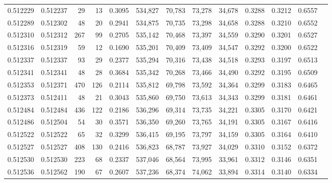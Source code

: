 \begin{tabular}{rrrrrrrrrrrrr}
0.512229 & 0.512237 &    29 &    13 &                                     0.3095 & 534,827 &  70,783 &  73,278 &  34,678 & 0.3288 & 0.3212 & 0.6557 \\
0.512289 & 0.512302 &    48 &    20 &                                     0.2941 & 534,875 &  70,735 &  73,298 &  34,658 & 0.3288 & 0.3210 & 0.6552 \\
0.512310 & 0.512312 &   267 &    99 &                                     0.2705 & 535,142 &  70,468 &  73,397 &  34,559 & 0.3290 & 0.3201 & 0.6527 \\
0.512316 & 0.512319 &    59 &    12 &                                     0.1690 & 535,201 &  70,409 &  73,409 &  34,547 & 0.3292 & 0.3200 & 0.6522 \\
0.512337 & 0.512337 &    93 &    29 &                                     0.2377 & 535,294 &  70,316 &  73,438 &  34,518 & 0.3293 & 0.3197 & 0.6513 \\
0.512341 & 0.512341 &    48 &    28 &                                     0.3684 & 535,342 &  70,268 &  73,466 &  34,490 & 0.3292 & 0.3195 & 0.6509 \\
0.512353 & 0.512371 &   470 &   126 &                                     0.2114 & 535,812 &  69,798 &  73,592 &  34,364 & 0.3299 & 0.3183 & 0.6465 \\
0.512373 & 0.512411 &    48 &    21 &                                     0.3043 & 535,860 &  69,750 &  73,613 &  34,343 & 0.3299 & 0.3181 & 0.6461 \\
0.512484 & 0.512484 &   436 &   122 &                                     0.2186 & 536,296 &  69,314 &  73,735 &  34,221 & 0.3305 & 0.3170 & 0.6421 \\
0.512486 & 0.512504 &    54 &    30 &                                     0.3571 & 536,350 &  69,260 &  73,765 &  34,191 & 0.3305 & 0.3167 & 0.6416 \\
0.512522 & 0.512522 &    65 &    32 &                                     0.3299 & 536,415 &  69,195 &  73,797 &  34,159 & 0.3305 & 0.3164 & 0.6410 \\
0.512527 & 0.512527 &   408 &   130 &                                     0.2416 & 536,823 &  68,787 &  73,927 &  34,029 & 0.3310 & 0.3152 & 0.6372 \\
0.512530 & 0.512530 &   223 &    68 &                                     0.2337 & 537,046 &  68,564 &  73,995 &  33,961 & 0.3312 & 0.3146 & 0.6351 \\
0.512536 & 0.512562 &   190 &    67 &                                     0.2607 & 537,236 &  68,374 &  74,062 &  33,894 & 0.3314 & 0.3140 & 0.6334 \\

\end{tabular}
